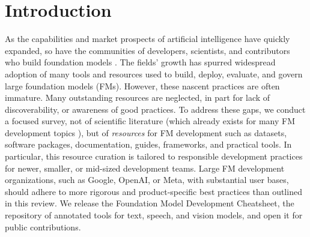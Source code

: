\section{Introduction}
\label{sec:introduction}

As the capabilities \citep{ustun2024aya, team2023gemini, gomez2024commandrplus, anthropic2024claude3, radford2023robust, sora2024} and market prospects \citep{vipra2023concentration,mcelheran2024ai} of artificial intelligence have quickly expanded, so have the communities of developers, scientists, and contributors who build foundation models \citep{bommasani2021opportunities}.
The fields' growth has spurred widespread adoption of many tools and resources used to build, deploy, evaluate, and govern large foundation models (FMs).
However, these nascent practices are often immature.
Many outstanding resources are neglected, in part for lack of discoverability, or awareness of good practices.
To address these gaps, we conduct a focused survey, not of scientific literature (which already exists for many FM development topics \citep{albalak2024survey, zhao2023survey, chang2023survey}), but of \emph{resources} for FM development such as datasets, software packages, documentation, guides, frameworks, and practical tools.
In particular, this resource curation is tailored to responsible development practices for newer, smaller, or mid-sized
 development teams.
Large FM development organizations, such as Google, OpenAI, or Meta, with substantial user bases, should adhere to more rigorous and product-specific best practices than outlined in this review.
We release the Foundation Model Development Cheatsheet, the repository of annotated tools for text, speech, and vision models, and open it for public contributions.%

